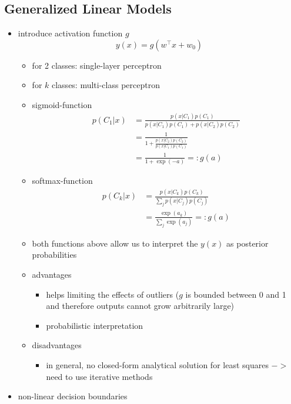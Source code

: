 \documentclass{article}
\begin{document}
\subsection{Generalized Linear Models}

\begin{itemize}
  \item introduce activation function $g$
  \[
    y(x) = g(w^\top x + w_0)
  \]
  \begin{itemize}
    \item for 2 classes: single-layer perceptron
    \item for $k$ classes: multi-class perceptron
  \end{itemize}
  \begin{itemize}
    \item sigmoid-function
    \begin{align*}
      p(C_1|x) &= \frac{p(x|C_1)p(C_1)}{p(x|C_1)p(C_1) + p(x|C_2)p(C_2)} \\
      \phantom{p(C_1|x)} &= \frac{1}{1 + \frac{p(x|C_2)p(C_2)}{p(x|C_1)p(C_1)}} \\
      \phantom{p(C_1|x)} &= \frac{1}{1 + \exp(-a)} =: g(a)
    \end{align*}
    \item softmax-function
    \begin{align*}
      p(C_k|x) &= \frac{p(x|C_k)p(C_k)}{\sum_j p(x|C_j)p(C_j)} \\
      \phantom{p(C_k|x)} &= \frac{\exp(a_k)}{\sum_j \exp(a_j)} =: g(a)
    \end{align*}
    \item both functions above allow us to interpret the $y(x)$ as posterior probabilities
    \item advantages
    \begin{itemize}
      \item helps limiting the effects of outliers ($g$ is bounded between 0 and 1 and therefore outputs cannot grow arbitrarily large)
      \item probabilistic interpretation
    \end{itemize}
    \item disadvantages
    \begin{itemize}
      \item in general, no closed-form analytical solution for least squares $->$ need to use iterative methods
    \end{itemize}
  \end{itemize}
  \item non-linear decision boundaries

\end{itemize}
\end{document}
